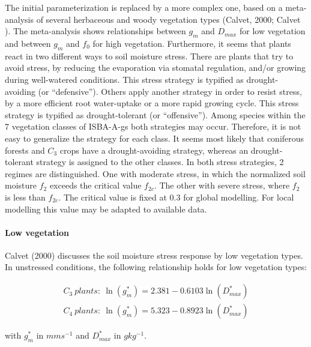 {The initial parameterization is replaced by a more complex one, based
on a meta-analysis of several
herbaceous and woody vegetation types (Calvet, 2000; Calvet ). The meta-analysis
shows relationships between $g_{m}$ and $D_{max}$ for low vegetation
and between $g_{m}$ and $f_{0}$ 
for high vegetation.
Furthermore, it seems that plants react in two different ways to soil moisture stress. There are plants
that try to avoid stress, by reducing the evaporation via stomatal regulation, and/or growing during
well-watered conditions. This stress strategy is typified as drought-avoiding (or “defensive”). Others
apply another strategy in order to resist stress, by a more efficient root water-uptake or a more rapid
growing cycle. This stress strategy is typified as drought-tolerant (or “offensive”). Among species
within the 7 vegetation classes of ISBA-A-gs both strategies may occur. Therefore, it is not easy to
generalize the strategy for each class. It seems most likely that coniferous forests and $C_{3}$ crops have
a drought-avoiding strategy, whereas an drought-tolerant strategy is assigned to the other classes. In
both stress strategies, 2 regimes are distinguished. One with moderate stress, in which the normalized
soil moisture $f_{2}$ exceeds the critical value $f_{2c}$. The other
with severe stress, 
where $f_{2}$ is less than $f_{2c}$. The
critical value is fixed at 0.3 for global modelling. For local
modelling this value may be adapted to
available data.


\paragraph{Low vegetation}

Calvet (2000) discusses the soil moisture stress response by low vegetation types. In unstressed
conditions, the following relationship holds for low vegetation types:

\begin{eqnarray}\label{eq18}
C_{3}~ plants:~ \ln(g_{m}^{*}) = 2.381-0.6103\ln(D_{max}^{*}) \\
C_{4}~ plants:~ \ln(g_{m}^{*}) = 5.323-0.8923\ln(D_{max}^{*})
\end{eqnarray}

with $g_{m}^{*}$ in $mm s^{-1}$
and $D_{max}^{*}$ in $g kg^{-1}$.

}
